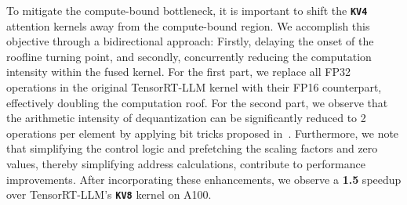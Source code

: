 To mitigate the compute-bound bottleneck, it is important to shift the \decodingstage \textbf{\texttt{KV4}} attention kernels away from the compute-bound region. We accomplish this objective through a bidirectional approach: Firstly, delaying the onset of the roofline turning point, and secondly, concurrently reducing the computation intensity within the fused kernel. For the first part, we replace all FP32 operations in the original TensorRT-LLM kernel with their FP16 counterpart, effectively doubling the computation roof.  For the second part, we observe that the arithmetic intensity of dequantization can be significantly reduced to 2 operations per element by applying bit tricks proposed in~\cite{kim2022says}. Furthermore, we note that simplifying the control logic and prefetching the scaling factors and zero values, thereby simplifying address calculations, contribute to performance improvements. After incorporating these enhancements, we observe a \textbf{1.5\x} speedup over TensorRT-LLM's \textbf{\texttt{KV8}} kernel on A100. 





